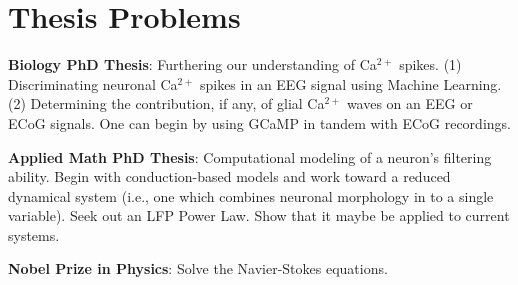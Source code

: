 \section{Thesis Problems}

\textbf{Biology PhD Thesis}: Furthering our understanding of Ca$^{2+}$ spikes. (1) Discriminating neuronal Ca$^{2+}$ spikes in an EEG signal using Machine Learning. (2) Determining the contribution, if any, of glial Ca$^{2+}$ waves on an EEG or ECoG signals. One can begin by using GCaMP in tandem with ECoG recordings. 

\textbf{Applied Math PhD Thesis}: Computational modeling of a neuron's filtering ability. Begin with conduction-based models and work toward a reduced dynamical system (i.e., one which combines neuronal morphology in to a single variable). Seek out an LFP Power Law. Show that it maybe be applied to current systems. 

\textbf{Nobel Prize in Physics}: Solve the Navier-Stokes equations.

\endinput
